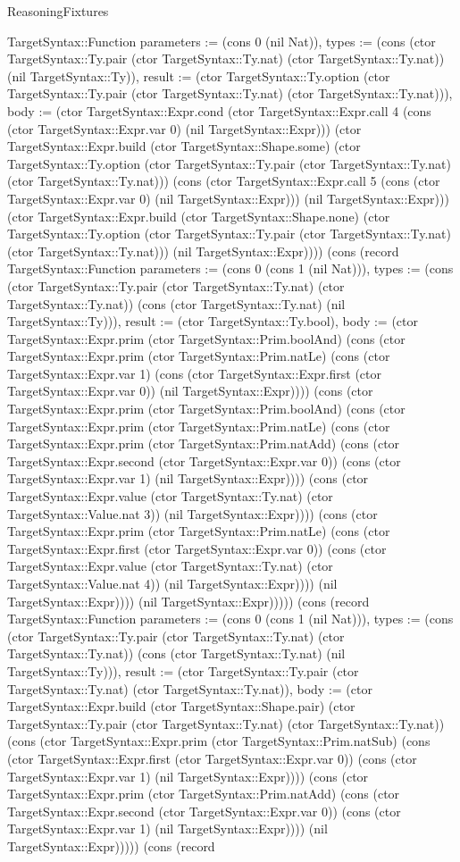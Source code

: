 \begin{lexlean}{ReasoningFixtures}
\begin{semanticmodule}
{TargetSyntax::Function {parameters := (cons 0 (nil Nat)), types := (cons (ctor TargetSyntax::Ty.pair (ctor TargetSyntax::Ty.nat) (ctor TargetSyntax::Ty.nat)) (nil TargetSyntax::Ty)), result := (ctor TargetSyntax::Ty.option (ctor TargetSyntax::Ty.pair (ctor TargetSyntax::Ty.nat) (ctor TargetSyntax::Ty.nat))), body := (ctor TargetSyntax::Expr.cond (ctor TargetSyntax::Expr.call 4 (cons (ctor TargetSyntax::Expr.var 0) (nil TargetSyntax::Expr))) (ctor TargetSyntax::Expr.build (ctor TargetSyntax::Shape.some) (ctor TargetSyntax::Ty.option (ctor TargetSyntax::Ty.pair (ctor TargetSyntax::Ty.nat) (ctor TargetSyntax::Ty.nat))) (cons (ctor TargetSyntax::Expr.call 5 (cons (ctor TargetSyntax::Expr.var 0) (nil TargetSyntax::Expr))) (nil TargetSyntax::Expr))) (ctor TargetSyntax::Expr.build (ctor TargetSyntax::Shape.none) (ctor TargetSyntax::Ty.option (ctor TargetSyntax::Ty.pair (ctor TargetSyntax::Ty.nat) (ctor TargetSyntax::Ty.nat))) (nil TargetSyntax::Expr)))}) (cons (record TargetSyntax::Function {parameters := (cons 0 (cons 1 (nil Nat))), types := (cons (ctor TargetSyntax::Ty.pair (ctor TargetSyntax::Ty.nat) (ctor TargetSyntax::Ty.nat)) (cons (ctor TargetSyntax::Ty.nat) (nil TargetSyntax::Ty))), result := (ctor TargetSyntax::Ty.bool), body := (ctor TargetSyntax::Expr.prim (ctor TargetSyntax::Prim.boolAnd) (cons (ctor TargetSyntax::Expr.prim (ctor TargetSyntax::Prim.natLe) (cons (ctor TargetSyntax::Expr.var 1) (cons (ctor TargetSyntax::Expr.first (ctor TargetSyntax::Expr.var 0)) (nil TargetSyntax::Expr)))) (cons (ctor TargetSyntax::Expr.prim (ctor TargetSyntax::Prim.boolAnd) (cons (ctor TargetSyntax::Expr.prim (ctor TargetSyntax::Prim.natLe) (cons (ctor TargetSyntax::Expr.prim (ctor TargetSyntax::Prim.natAdd) (cons (ctor TargetSyntax::Expr.second (ctor TargetSyntax::Expr.var 0)) (cons (ctor TargetSyntax::Expr.var 1) (nil TargetSyntax::Expr)))) (cons (ctor TargetSyntax::Expr.value (ctor TargetSyntax::Ty.nat) (ctor TargetSyntax::Value.nat 3)) (nil TargetSyntax::Expr)))) (cons (ctor TargetSyntax::Expr.prim (ctor TargetSyntax::Prim.natLe) (cons (ctor TargetSyntax::Expr.first (ctor TargetSyntax::Expr.var 0)) (cons (ctor TargetSyntax::Expr.value (ctor TargetSyntax::Ty.nat) (ctor TargetSyntax::Value.nat 4)) (nil TargetSyntax::Expr)))) (nil TargetSyntax::Expr)))) (nil TargetSyntax::Expr))))}) (cons (record TargetSyntax::Function {parameters := (cons 0 (cons 1 (nil Nat))), types := (cons (ctor TargetSyntax::Ty.pair (ctor TargetSyntax::Ty.nat) (ctor TargetSyntax::Ty.nat)) (cons (ctor TargetSyntax::Ty.nat) (nil TargetSyntax::Ty))), result := (ctor TargetSyntax::Ty.pair (ctor TargetSyntax::Ty.nat) (ctor TargetSyntax::Ty.nat)), body := (ctor TargetSyntax::Expr.build (ctor TargetSyntax::Shape.pair) (ctor TargetSyntax::Ty.pair (ctor TargetSyntax::Ty.nat) (ctor TargetSyntax::Ty.nat)) (cons (ctor TargetSyntax::Expr.prim (ctor TargetSyntax::Prim.natSub) (cons (ctor TargetSyntax::Expr.first (ctor TargetSyntax::Expr.var 0)) (cons (ctor TargetSyntax::Expr.var 1) (nil TargetSyntax::Expr)))) (cons (ctor TargetSyntax::Expr.prim (ctor TargetSyntax::Prim.natAdd) (cons (ctor TargetSyntax::Expr.second (ctor TargetSyntax::Expr.var 0)) (cons (ctor TargetSyntax::Expr.var 1) (nil TargetSyntax::Expr)))) (nil TargetSyntax::Expr))))}) (cons (record }
\end{semanticmodule}
\end{lexlean}
